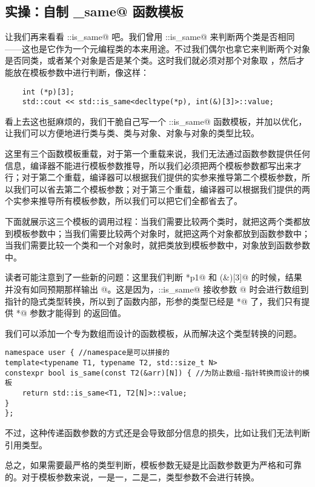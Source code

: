 \subsection*{实操：自制 \lstinline@is_same@ 函数模板}
让我们再来看看 \lstinline@std::is_same@ 吧。我们曾用 \lstinline@std::is_same@ 来判断两个类是否相同——这也是它作为一个元编程类的本来用途。不过我们偶尔也拿它来判断两个对象是否同类，或者某个对象是否是某个类。这时我们就必须对那个对象取 \lstinline@decltype@，然后才能放在模板参数中进行判断，像这样：
\begin{lstlisting}
    int (*p)[3];
    std::cout << std::is_same<decltype(*p), int(&)[3]>::value;
\end{lstlisting}\par
看上去这也挺麻烦的，我们干脆自己写一个 \lstinline@user::is_same@ 函数模板，并加以优化，让我们可以方便地进行类与类、类与对象、对象与对象的类型比较。

这里有三个函数模板重载，对于第一个重载来说，我们无法通过函数参数提供任何信息，编译器不能进行模板参数推导，所以我们必须把两个模板参数都写出来才行；对于第二个重载，编译器可以根据我们提供的实参来推导第二个模板参数，所以我们可以省去第二个模板参数；对于第三个重载，编译器可以根据我们提供的两个实参来推导所有模板参数，所以我们可以把它们全都省去了。\par
下面就展示这三个模板的调用过程：当我们需要比较两个类时，就把这两个类都放到模板参数中；当我们需要比较两个对象时，就把这两个对象都放到函数参数中；当我们需要比较一个类和一个对象时，就把类放到模板参数中，对象放到函数参数中。\par

读者可能注意到了一些新的问题：这里我们判断 \lstinline@*p1@ 和 \lstinline@int(&)[3]@ 的时候，结果并没有如同预期那样输出 @。这是因为，\lstinline@user::is_same@ 接收参数 @ 时会进行数组到指针的隐式类型转换，所以到了函数内部，\lstinline@obj@ 形参的类型已经是 \lstinline@int*@ 了，我们只有提供 \lstinline@int*@ 参数才能得到 \lstinline@true@ 的返回值。\par
我们可以添加一个专为数组而设计的函数模板，从而解决这个类型转换的问题。
\begin{lstlisting}
namespace user { //namespace是可以拼接的
template<typename T1, typename T2, std::size_t N>
constexpr bool is_same(const T2(&arr)[N]) { //为防止数组-指针转换而设计的模板
    return std::is_same<T1, T2[N]>::value;
}
};
\end{lstlisting}
不过，这种传递函数参数的方式还是会导致部分信息的损失，比如让我们无法判断引用类型。\par
总之，如果需要最严格的类型判断，模板参数无疑是比函数参数更为严格和可靠的。对于模板参数来说，一是一，二是二，类型参数不会进行转换。\par
